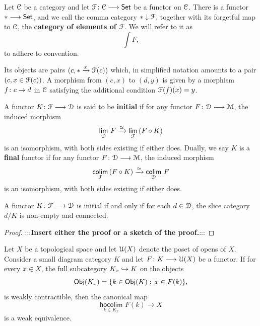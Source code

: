 \documentclass{amsbook}
\begin{document}
\begin{definition}\label{ap:: def: cat of els}
    Let $\mathcal C$ be a category and let $\mathcal F\colon \mathcal C \longrightarrow \operatorname{{\mathsf{Set}}}$ be a functor on $\mathcal C$. There is a functor $* \longrightarrow \operatorname{{\mathsf{Set}}}$, and we call the comma category $* \downarrow \mathcal F$, together with its forgetful map to $\mathcal C$, the \textbf{category of elements of $\mathcal F$}. We will refer to it as
    \begin{equation}
        \int F,
    \end{equation}
    to adhere to convention.

    \medskip

    \nid Its objects are pairs $(c,*\xrightarrow{x} \mathcal F(c))$ which, in simplified notation amounts to a pair $(c,x\in\mathcal F(c))$. A morphism from $(c,x)$ to $(d,y)$ is given by a morphism $f\colon c \rightarrow d$ in $\mathcal C$ satisfying the additional condition $\mathcal F(f)(x) = y$.
\end{definition}



\begin{definition}\label{ap:: def: initial functor}
    A functor $K\colon \mathcal F \longrightarrow \mathcal D$ is said to be \textbf{initial} if for any functor $F\colon \mathcal D \longrightarrow \mathcal M$, the induced morphism 
    \begin{equation}
        \Limit[\cD]{F} \xra{\simeq} \Limit[\cF]{(F\circ K)}
    \end{equation}
    is an isomorphism, with both sides existing if either does. Dually, we say $K$ is a \textbf{final} functor if for any functor $F\colon \mathcal D \longrightarrow \mathcal M$, the induced morphism
    \begin{equation}
        \Colimit[\cF]{(F\circ K)} \xra{\simeq} \Colimit[\cD]{F}
    \end{equation}
    is an isomorphism, with both sides existing if either does.
\end{definition}

\begin{lemma}
    A functor $K\colon \mathcal F \longrightarrow \mathcal D$ is initial if and only if for each $d\in \mathcal D$, the slice category $d/K$ is non-empty and connected. 
\end{lemma}
\begin{proof}
    :::\textbf{Insert either the proof or a sketch of the proof.}::: 
\end{proof}


\begin{theorem}\label{ap:: thm: lurie Seifert}
Let $X$ be a topological space and let $\mathcal U(X)$ denote the poset of opens of $X$. Consider a small diagram category $K$ and let $F\colon K \longrightarrow \mathcal U(X)$ be a functor. If for every $x\in X$, the full subcategory $K_x \hookrightarrow K$ on the objects
\begin{equation}
    \operatorname{\mathsf{Obj}}(K_x) = \{k \in \operatorname{\mathsf{Obj}}(K):\, x\in F(k)\}, 
\end{equation} 
is weakly contractible, then the canonical map
\begin{equation}
    \underset{k\in K_x}{\mathsf{hocolim}}\,\, F(k) \longrightarrow X
\end{equation}
is a weak equivalence.
\end{theorem}
\end{document}
